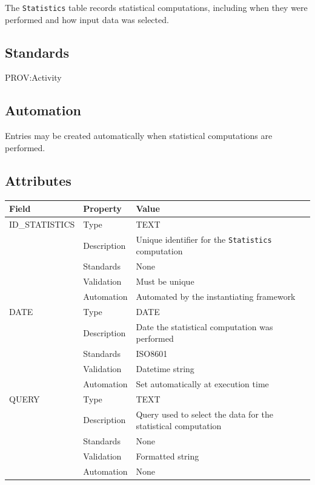 \documentclass[
]{article}
\newcounter{none}
\begin{document}
The \texttt{Statistics} table records statistical computations,
including when they were performed and how input data was selected.

\subsection{Standards}\label{standards-33}

PROV:Activity

\subsection{Automation}\label{automation-33}

Entries may be created automatically when statistical computations are
performed.

\subsection{Attributes}\label{attributes-28}

{\def\LTcaptype{none} 
\begin{longtable}[]{@{}
  >{\raggedright\arraybackslash}p{}
  >{\raggedright\arraybackslash}p{}
  >{\raggedright\arraybackslash}p{}@{}}
\toprule\noalign{}
\begin{minipage}[b]{\linewidth}\raggedright
Field
\end{minipage} & \begin{minipage}[b]{\linewidth}\raggedright
Property
\end{minipage} & \begin{minipage}[b]{\linewidth}\raggedright
Value
\end{minipage} \\
\midrule\noalign{}
\endhead
\bottomrule\noalign{}
\endlastfoot
ID\_STATISTICS & Type & TEXT \\
& Description & Unique identifier for the \texttt{Statistics}
computation \\
& Standards & None \\
& Validation & Must be unique \\
& Automation & Automated by the instantiating framework \\
DATE & Type & DATE \\
& Description & Date the statistical computation was performed \\
& Standards & ISO8601 \\
& Validation & Datetime string \\
& Automation & Set automatically at execution time \\
QUERY & Type & TEXT \\
& Description & Query used to select the data for the statistical
computation \\
& Standards & None \\
& Validation & Formatted string \\
& Automation & None \\
\end{longtable}
}
\end{document}

